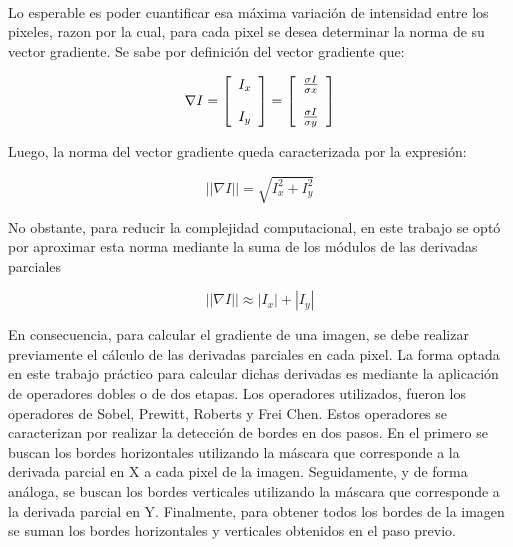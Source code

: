 \documentclass[11pt, a4paper]{article}
\begin{document}
\paragraph{}
Lo esperable es poder cuantificar esa m\'axima variaci\'on de intensidad entre los pixeles, razon por la cual, para cada pixel se desea determinar la norma de su vector gradiente. Se sabe por definici\'on del vector gradiente que:


$$
\nabla I = \left[ \begin{array}{l}
\vspace{11 pt}
I_x\\
I_y
\end{array}
\right]
= \left[ \begin{array}{l}
\vspace{11 pt}
\frac{\sigma I}{\sigma x}\\
\frac{\sigma I}{\sigma y}
\end{array}
\right]
$$



Luego, la norma del vector gradiente queda caracterizada por la expresi\'on:

\begin{equation}
||\nabla I|| = \sqrt{I_x ^{2}+ I_y^{2}}
\end{equation}



No obstante, para reducir la complejidad computacional, en este trabajo se opt\'o por aproximar esta norma mediante la suma de los m\'odulos de las derivadas parciales

\begin{equation}
||\nabla I|| \approx |I_x| + |I_y|
\end{equation}


En consecuencia, para calcular el gradiente de una imagen, se debe realizar previamente el c\'alculo de las derivadas parciales en cada pixel.
La forma optada en este trabajo pr\'actico para calcular dichas derivadas es mediante la aplicaci\'on de operadores dobles o de dos etapas. Los operadores utilizados, fueron los operadores de Sobel, Prewitt, Roberts y Frei Chen. Estos operadores se caracterizan por realizar la detecci\'on de bordes en dos pasos. En el primero se buscan los bordes horizontales utilizando la m\'ascara que corresponde a la derivada parcial en X a cada pixel de la imagen. Seguidamente, y de forma an\'aloga, se buscan los bordes verticales utilizando la m\'ascara que corresponde a la derivada parcial en Y. Finalmente, para obtener todos los bordes de la imagen se suman los bordes horizontales y verticales obtenidos en el paso previo.
\end{document}
